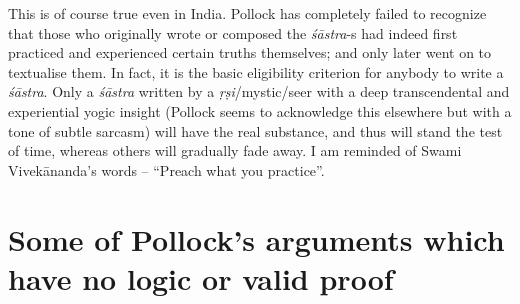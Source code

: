 This is of course true even in India. Pollock has completely failed to recognize that those who originally wrote or composed the {\it śāstra}-s had indeed first practiced and experienced certain truths themselves; and only later went on to textualise them. In fact, it is the basic eligibility criterion for anybody to write a {\it śāstra}. Only a {\it śāstra} written by a {\it ṛṣi}/mystic/seer with a deep transcendental and experiential yogic insight (Pollock seems to acknowledge this elsewhere but with a tone of subtle sarcasm) will have the real substance, and thus will stand the test of time, whereas others will gradually fade away. I am reminded of Swami Vivekānanda's words -- ``Preach what you practice''.

\section*{Some of Pollock's arguments which have no logic or valid proof}

